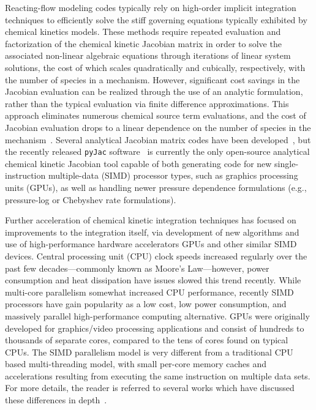 \documentclass[preprint]{elsarticle}
\begin{document}
Reacting-flow modeling codes typically rely on high-order implicit integration techniques to efficiently solve the stiff governing equations typically exhibited by chemical kinetics models.
These methods require repeated evaluation and factorization of the chemical kinetic Jacobian matrix in order to solve the associated non-linear algebraic equations through iterations of linear system solutions, the cost of which scales quadratically and cubically, respectively, with the number of species in a mechanism.
However, significant cost savings in the Jacobian evaluation can be realized through the use of an analytic formulation, rather than the typical evaluation via finite difference approximations.
This approach eliminates numerous chemical source term evaluations, and the cost of Jacobian evaluation drops to a linear dependence on the number of species in the mechanism~\cite{Lu:2009gh}.
Several analytical Jacobian matrix codes have been developed~\cite{Safta:2011vn,Youssefi:2011tm,Bisetti:2012jw,Perini:2012gy,Dijkmans:2014bb}, but the recently released \texttt{pyJac} software~\cite{Niemeyer:2015im,Niemeyer:2015ws} is currently the only open-source analytical chemical kinetic Jacobian tool capable of both generating code for new single-instruction multiple-data (SIMD) processor types, such as graphics processing units (GPUs), as well as handling newer pressure dependence formulations (e.g., pressure-log or Chebyshev rate formulations).

Further acceleration of chemical kinetic integration techniques has focused on improvements to the integration itself, via development of new algorithms and use of high-performance hardware accelerators GPUs and other similar SIMD devices.
Central processing unit (CPU) clock speeds increased regularly over the past few decades---commonly known as Moore's Law---however, power consumption and heat dissipation have issues slowed this trend recently.
While multi-core parallelism somewhat increased CPU performance, recently SIMD processors have gain popularity as a low cost, low power consumption, and massively parallel high-performance computing alternative.
GPUs were originally developed for graphics\slash video processing applications and consist of hundreds to thousands of separate cores, compared to the tens of cores found on typical CPUs.
The SIMD parallelism model is very different from a traditional CPU based multi-threading model, with small per-core memory caches and accelerations resulting from executing the same instruction on multiple data sets.
For more details, the reader is referred to several works which have discussed these differences in depth~\cite{Cruz:2011gc,Brodtkorb:2013hn,Niemeyer:2014hn}.
\end{document}
